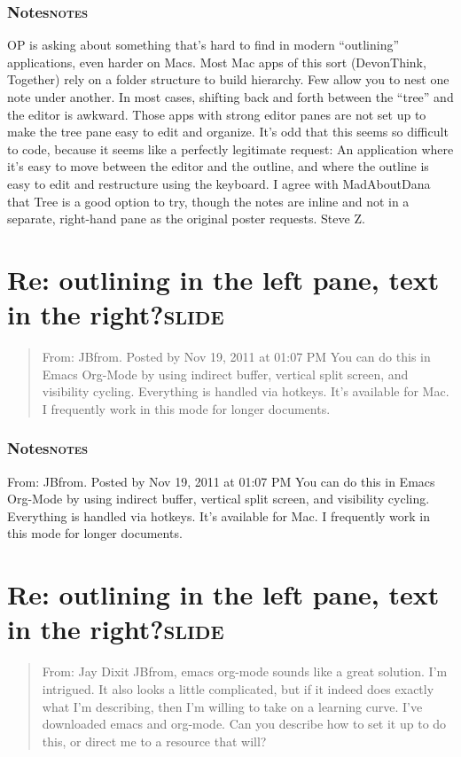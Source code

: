 \documentclass[11pt]{article}
\begin{document}
\subsubsection{Notes\hfill{}\textsc{notes}}
\label{sec:orgheadline23}
OP is asking about something that's hard to find in modern ``outlining'' applications, even harder on Macs. Most Mac apps of this sort (DevonThink, Together) rely on a folder structure to build hierarchy. Few allow you to nest one note under another. In most cases, shifting back and forth between the ``tree'' and the editor is awkward. Those apps with strong editor panes are not set up to make the tree pane easy to edit and organize. It's odd that this seems so difficult to code, because it seems like a perfectly legitimate request: An application where it's easy to move between the editor and the outline, and where the outline is easy to edit and restructure using the keyboard. I agree with MadAboutDana that Tree is a good option to try, though the notes are inline and not in a separate, right-hand pane as the original poster requests. Steve Z. 


\section{Re: outlining in the left pane, text in the right?\hfill{}\textsc{slide}}
\label{sec:orgheadline26}
\begin{quote}
From: JBfrom. Posted by Nov 19, 2011 at 01:07 PM You can do this in Emacs Org-Mode by using indirect buffer, vertical split screen, and visibility cycling. Everything is handled via hotkeys. It's available for Mac. I frequently work in this mode for longer documents. 
\end{quote}

\subsubsection{Notes\hfill{}\textsc{notes}}
\label{sec:orgheadline25}
From: JBfrom. Posted by Nov 19, 2011 at 01:07 PM You can do this in Emacs Org-Mode by using indirect buffer, vertical split screen, and visibility cycling. Everything is handled via hotkeys. It's available for Mac. I frequently work in this mode for longer documents. 


\section{Re: outlining in the left pane, text in the right?\hfill{}\textsc{slide}}
\label{sec:orgheadline28}
\begin{quote}
From: Jay Dixit 
JBfrom, emacs org-mode sounds like a great solution. I'm intrigued. It also looks a little complicated, but if it indeed does exactly what I'm describing, then I'm willing to take on a learning curve. I've downloaded emacs and org-mode. Can you describe how to set it up to do this, or direct me to a resource that will? 
\end{quote}
\end{document}
